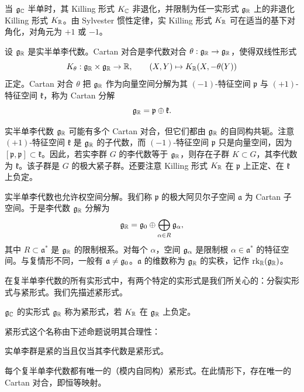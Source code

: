 当 $\mathfrak{g}_{\mathbb{C}}$ 半单时，其 Killing 形式 $K_{\mathbb{C}}$ 非退化，并限制为任一实形式 $\mathfrak{g}_{\mathbb{R}}$ 上的非退化 Killing 形式 $K_{\mathbb{R}}$。由 Sylvester 惯性定律，实 Killing 形式 $K_{\mathbb{R}}$ 可在适当的基下对角化，对角元为 $+1$ 或 $-1$。

\begin{definition}[A.21] 设 $\mathfrak{g}_{\mathbb{R}}$ 是实半单李代数。Cartan 对合是李代数对合 $\theta:\mathfrak{g}_{\mathbb{R}}\to\mathfrak{g}_{\mathbb{R}}$，使得双线性形式
\[
K_\theta:\mathfrak{g}_{\mathbb{R}}\times\mathfrak{g}_{\mathbb{R}}\to\mathbb{R},\qquad (X,Y)\mapsto K_{\mathbb{R}}(X,-\theta(Y))
\]
正定。Cartan 对合 $\theta$ 把 $\mathfrak{g}_{\mathbb{R}}$ 作为向量空间分解为其 $(-1)$-特征空间 $\mathfrak{p}$ 与 $(+1)$-特征空间 $\mathfrak{k}$，称为 Cartan 分解
\[
\mathfrak{g}_{\mathbb{R}}=\mathfrak{p}\oplus\mathfrak{k}.
\]
\end{definition}

实半单李代数 $\mathfrak{g}_{\mathbb{R}}$ 可能有多个 Cartan 对合，但它们都由 $\mathfrak{g}_{\mathbb{R}}$ 的自同构共轭。注意 $(+1)$-特征空间 $\mathfrak{k}$ 是 $\mathfrak{g}_{\mathbb{R}}$ 的子代数，而 $(-1)$-特征空间 $\mathfrak{p}$ 只是向量空间，因为 $[\mathfrak{p},\mathfrak{p}]\subset\mathfrak{k}$。因此，若实李群 $G$ 的李代数等于 $\mathfrak{g}_{\mathbb{R}}$，则存在子群 $K\subset G$，其李代数为 $\mathfrak{k}$。该子群是 $G$ 的极大紧子群。还要注意 Killing 形式 $K_{\mathbb{R}}$ 在 $\mathfrak{p}$ 上正定、在 $\mathfrak{k}$ 上负定。

实半单李代数也允许权空间分解。我们称 $\mathfrak{p}$ 的极大阿贝尔子空间 $\mathfrak{a}$ 为 Cartan 子空间。于是李代数 $\mathfrak{g}_{\mathbb{R}}$ 分解为
\[
\mathfrak{g}_{\mathbb{R}}=\mathfrak{g}_0\oplus\bigoplus_{\alpha\in R}\mathfrak{g}_\alpha,
\]
其中 $R\subset\mathfrak{a}^{*}$ 是 $\mathfrak{g}_{\mathbb{R}}$ 的限制根系。对每个 $\alpha$，空间 $\mathfrak{g}_\alpha$ 是限制根 $\alpha\in\mathfrak{a}^{*}$ 的特征空间。与复情形不同，一般有 $\mathfrak{a}\ne\mathfrak{g}_0$。$\mathfrak{a}$ 的维数称为 $\mathfrak{g}_{\mathbb{R}}$ 的实秩，记作 $\operatorname{rk}_{\mathbb{R}}(\mathfrak{g}_{\mathbb{R}})$。

在复半单李代数的所有实形式中，有两个特定的实形式是我们所关心的：分裂实形式与紧形式。我们先描述紧形式。

\begin{definition}[A.22] $\mathfrak{g}_{\mathbb{C}}$ 的实形式 $\mathfrak{g}_{\mathbb{R}}$ 称为紧形式，若 $K_{\mathbb{R}}$ 在 $\mathfrak{g}_{\mathbb{R}}$ 上负定。
\end{definition}

紧形式这个名称由下述命题说明其合理性：

\begin{proposition}[A.23] 实单李群是紧的当且仅当其李代数是紧形式。
\end{proposition}

\begin{remark}[A.24] 每个复半单李代数都有唯一的（模内自同构）紧形式。在此情形下，存在唯一的 Cartan 对合，即恒等映射。
\end{remark}

